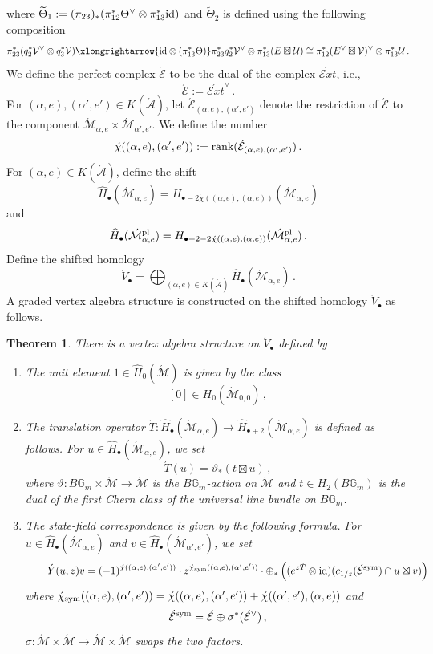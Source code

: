 \documentclass[11pt]{amsart}
\newtheorem{theorem}{Theorem}
\theoremstyle{remark}
\newcommand{\Adash}{\acute{\mathcal{A}}}
\newcommand{\mb}[1]{\mathbb{#1}}
\newcommand{\mc}[1]{\mathcal{#1}}
\newcommand{\Mdash}{\acute{\mathcal{M}}}
\newcommand{\U}{\mathcal{U}}
\newcommand{\V}{\mathcal{V}}
\newcommand{\rk}{\textnormal{rank}}
\newcommand{\id}{\textup{id}}
\newcommand{\wt}[1]{\widetilde{#1}}
\newcommand{\wh}[1]{\widehat{#1}}
\newcommand{\EXT}[0]{\mathscr{E}xt}
\newcommand{\pl}[0]{\textnormal{pl}}
\newcommand{\sym}{\textnormal{sym}}
\numberwithin{theorem}{section}
\begin{document}
    \noindent{}
    where $\wt \Theta_1 := (\pi_{23})_*(\pi_{12}^*\Theta^\vee \otimes \pi_{13}^*\id)$
    and $\wt \Theta_2$ is defined using the following composition
    $$\pi_{23}^*(q_2^*\V^\vee \otimes q_3^*\V)
    \xlongrightarrow{\id \otimes (\pi_{13}^*\Theta)} 
    \pi_{23}^*q_2^*\V^\vee \otimes \pi_{13}^*(E \boxtimes \U)
    \cong \pi_{12}^*(E^\vee \boxtimes \V)^\vee \otimes \pi_{13}^*\U\,.$$
    We define the perfect complex $\acute{\mc E}$ to be the dual of the complex $\acute{\EXT}$, i.e.,
    $$\acute{\mc E} := \acute{\EXT}^\vee\,.$$
    For $(\alpha,e), (\alpha',e') \in K(\Adash)$,
    let $\acute{\mc E}_{(\alpha,e), (\alpha',e')}$ denote the restriction of $\acute{\mc E}$ to the component 
    $\Mdash_{\alpha,e} \times \Mdash_{\alpha',e'}$.
    We define the number
    $$\acute{\chi}((\alpha,e), (\alpha',e')) := \rk(\acute{\mc E}_{(\alpha,e), (\alpha',e')})\,.$$
    For $(\alpha,e) \in K(\Adash)$, define the shift
    $$\wh{H}_\bullet(\Mdash_{\alpha,e}) = H_{\bullet-2\acute{\chi}((\alpha,e),(\alpha,e))}(\Mdash_{\alpha,e})$$
    and
    $$\wh{H}_\bullet(\Mdash^\pl_{\alpha,e}) = H_{\bullet+2-2\acute{\chi}((\alpha,e),(\alpha,e))}(\Mdash^\pl_{\alpha,e})\,.$$
    Define the shifted homology 
    $$ \acute{V}_\bullet = \bigoplus_{(\alpha,e) \in K(\Adash)} \wh{H}_\bullet(\Mdash_{\alpha,e})\,.$$
    A graded vertex algebra structure is constructed on the shifted homology $\acute{V}_{\bullet}$ as follows.
    \begin{theorem}{\cite[Theorem 3.12]{Joy21}}\label{theorem vertex algebra structure}
    There is a vertex algebra structure on $\acute{V}_\bullet$ defined by
    \begin{enumerate}
        \item The unit element
        $1 \in \wh{H}_0(\Mdash)$ is given by the class
        $$ [0] \in H_0(\Mdash_{0,0})\, ,$$
        \item The translation operator $\acute{T} : \wh H_\bullet(\Mdash_{\alpha,e}) \longrightarrow \wh H_{\bullet+2}(\Mdash_{\alpha,e})$ is defined as follows.
        For $u \in \wh H_\bullet(\Mdash_{\alpha,e})$, we set
        $$\acute{T}(u) = \vartheta_*(t \boxtimes u)\, ,$$
        where $\vartheta: B\mb G_m \times \Mdash \to \Mdash$
        is the $B\mb G_m$-action on $\Mdash$ and
        $t \in H_2(B\mb G_m)$ is the dual of the first Chern class of the universal line bundle on $B\mb G_m$.
        \item The state-field correspondence is given by the following formula. 
        For $u \in \wh{H}_\bullet(\Mdash_{\alpha,e})$ and 
        $v \in \wh{H}_\bullet(\Mdash_{\alpha',e'})$, we set
        $$\qquad \acute Y(u,z)v = (-1)^{\acute{\chi}((\alpha,e), (\alpha',e'))} \cdot z^{\acute{\chi}_{\sym}((\alpha,e),(\alpha',e'))} \cdot 
        \oplus_* \left((e^{z\acute{T}} \otimes \id) ( c_{1/z}( \acute{\mc E}^{\sym}) \cap u \boxtimes v) \right) $$
        where $\acute{\chi}_{\sym}((\alpha,e),(\alpha',e')) = {\acute{\chi}((\alpha,e),(\alpha',e'))} + {\acute{\chi}((\alpha',e'),(\alpha,e))}$
        and $$\acute{\mc E}^{\sym} = \acute{\mc E} \oplus \sigma^*(\acute{\mc E}^\vee)\, ,$$ $\sigma : \Mdash \times \Mdash \to \Mdash \times \Mdash$ swaps the two factors.
    \end{enumerate}
    \end{theorem}
\end{document}
